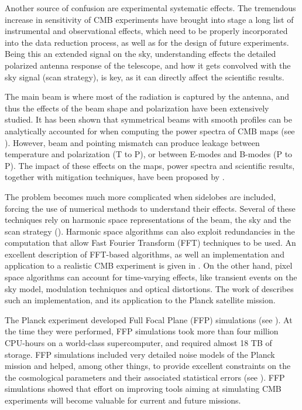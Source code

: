 \documentclass[a4paper,11pt]{article}
\begin{document}
Another source of confusion are experimental systematic effects. The tremendous increase in sensitivity of CMB experiments have brought into stage a long list of instrumental and observational effects, which need to be properly incorporated into the data reduction process, as well as for the design of future experiments. Being this an extended signal on the sky, understanding effects the detailed polarized antenna response of the telescope, and how it gets convolved with the sky signal (scan strategy), is key, as it can directly affect the scientific results.

The main beam is where most of the radiation is captured by the antenna, and thus the effects of the beam shape and polarization have been extensively studied. 
It has been shown that symmetrical beams with smooth profiles can be analytically accounted for when computing the power spectra of CMB maps (see \cite{2003ApJS..148...39P}).
However, beam and pointing mismatch can produce leakage between temperature and polarization (T to P), or between E-modes and B-modes (P to P). The impact of these effects on the maps, power spectra and scientific results, together with mitigation techniques, have been proposed by \cite{PhysRevD.77.083003, 2007MNRAS.376.1767O, 2015JCAP...03..048D}.

The problem becomes much more complicated when sidelobes are included, forcing the use of numerical methods to understand their effects.
Several of these techniques rely on harmonic space representations of the beam, the sky and the scan strategy (\cite{2001PhRvD..63l3002W,2000PhRvD..62l3002C}). Harmonic space algorithms can also exploit redundancies in the computation that allow Fast Fourier Transform (FFT) techniques to be used. An excellent description of FFT-based algorithms, as well an implementation and application to a realistic CMB experiment is given in \cite{2018arXiv180905034D}. On the other hand, pixel space algorithms can account for time-varying effects, like transient events on the sky model, modulation techniques and optical distortions. The work of \cite{2011ApJS..193....5M} describes such an implementation, and its application to the Planck satellite mission.

The Planck experiment developed Full Focal Plane (FFP) simulations (see \cite{2016A&A...594A..12P}). At the time they were performed, FFP simulations took more than four million CPU-hours on a world-class supercomputer, and required almost 18 TB of storage. FFP simulations included very detailed noise models of the Planck mission and helped, among other things, to provide excellent constraints on the the cosmological parameters and their associated statistical errors (see \cite{2016A&A...594A..13P}). FFP simulations showed that effort on improving tools aiming at simulating CMB experiments will become valuable for current and future missions.
\end{document}
